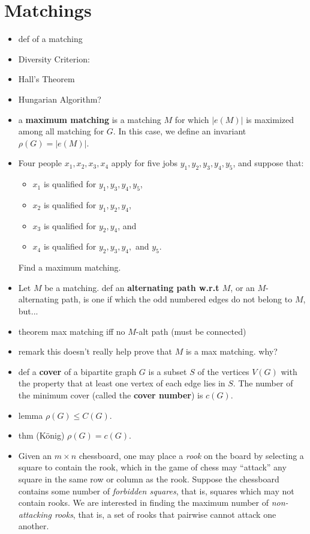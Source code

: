 \section{Matchings}\label{sec:matchings}

\begin{itemize}
    \item def of a matching
    \item Diversity Criterion:
    \item Hall's Theorem
    \item Hungarian Algorithm?


    \item a \textbf{maximum matching} is a matching $M$ for which $|e(M)|$ is maximized among all matching for $G$.  In this case, we define an invariant $\rho(G) = |e(M)|$.
    \item Four people $x_1, x_2, x_3, x_4$ apply for five jobs $y_1, y_2, y_3, y_4, y_5$, and suppose that:
    \begin{itemize}
        \item $x_1$ is qualified for $y_1, y_3, y_4, y_5$,
        \item $x_2$ is qualified for $y_1, y_2, y_4$,
        \item $x_3$ is qualified for $ y_2, y_4$, and
        \item $x_4$ is qualified for $ y_2, y_3, y_4,$ and $y_5$.
    \end{itemize}
    Find a maximum matching.
    \item Let $M$ be a matching.  def an \textbf{alternating path w.r.t $M$}, or an $M$-alternating path, is one if which the odd numbered edges do not belong to $M$, but...
    \item theorem max matching iff no $M$-alt path (must be connected)
    \item remark this doesn't really help prove that $M$ is a max matching.  why?
    \item def a \textbf{cover} of a bipartite graph $G$ is a subset $S$ of the vertices $V(G)$ with the property that at least one vertex of each edge lies in $S$.  The number of the minimum cover (called the \textbf{cover number}) is $c(G)$.
    \item lemma $\rho(G) \leq C(G)$.
    \item thm (K\"onig) $\rho(G) = c(G)$.
    \item Given an $m\times n$ chessboard, one may place a \textit{rook} on the board by selecting a square to contain the rook, which in the game of chess may ``attack'' any square in the same row or column as the rook.  Suppose the chessboard contains some number of \textit{forbidden squares}, that is, squares which may not contain rooks.  We are interested in finding the maximum number of \textit{non-attacking rooks}, that is, a set of rooks that pairwise cannot attack one another.


\end{itemize}
